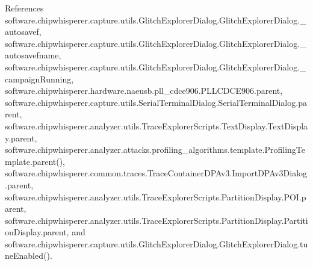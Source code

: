 References software.\+chipwhisperer.\+capture.\+utils.\+Glitch\+Explorer\+Dialog.\+Glitch\+Explorer\+Dialog.\+\_\+autosavef, software.\+chipwhisperer.\+capture.\+utils.\+Glitch\+Explorer\+Dialog.\+Glitch\+Explorer\+Dialog.\+\_\+autosavefname, software.\+chipwhisperer.\+capture.\+utils.\+Glitch\+Explorer\+Dialog.\+Glitch\+Explorer\+Dialog.\+\_\+campaign\+Running, software.\+chipwhisperer.\+hardware.\+naeusb.\+pll\+\_\+cdce906.\+P\+L\+L\+C\+D\+C\+E906.\+parent, software.\+chipwhisperer.\+capture.\+utils.\+Serial\+Terminal\+Dialog.\+Serial\+Terminal\+Dialog.\+parent, software.\+chipwhisperer.\+analyzer.\+utils.\+Trace\+Explorer\+Scripts.\+Text\+Display.\+Text\+Display.\+parent, software.\+chipwhisperer.\+analyzer.\+attacks.\+profiling\+\_\+algorithms.\+template.\+Profiling\+Template.\+parent(), software.\+chipwhisperer.\+common.\+traces.\+Trace\+Container\+D\+P\+Av3.\+Import\+D\+P\+Av3\+Dialog.\+parent, software.\+chipwhisperer.\+analyzer.\+utils.\+Trace\+Explorer\+Scripts.\+Partition\+Display.\+P\+O\+I.\+parent, software.\+chipwhisperer.\+analyzer.\+utils.\+Trace\+Explorer\+Scripts.\+Partition\+Display.\+Partition\+Display.\+parent, and software.\+chipwhisperer.\+capture.\+utils.\+Glitch\+Explorer\+Dialog.\+Glitch\+Explorer\+Dialog.\+tune\+Enabled().



